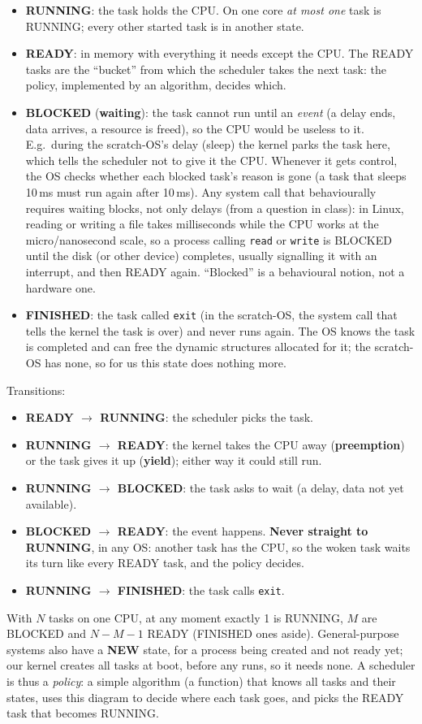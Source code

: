 \begin{itemize}
    \item \textbf{RUNNING}: the task holds the CPU. On one core \emph{at most one} task is RUNNING; every other started task is in another state.
    \item \textbf{READY}: in memory with everything it needs except the CPU. The READY tasks are the ``bucket'' from which the scheduler takes the next task: the policy, implemented by an algorithm, decides which.
    \item \textbf{BLOCKED} (\textbf{waiting}): the task cannot run until an \emph{event} (a delay ends, data arrives, a resource is freed), so the CPU would be useless to it. E.g.\ during the scratch-OS's delay (sleep) the kernel parks the task here, which tells the scheduler not to give it the CPU. Whenever it gets control, the OS checks whether each blocked task's reason is gone (a task that sleeps 10\,ms must run again after 10\,ms). Any system call that behaviourally requires waiting blocks, not only delays (from a question in class): in Linux, reading or writing a file takes milliseconds while the CPU works at the micro/nanosecond scale, so a process calling \texttt{read} or \texttt{write} is BLOCKED until the disk (or other device) completes, usually signalling it with an interrupt, and then READY again. ``Blocked'' is a behavioural notion, not a hardware one.
    \item \textbf{FINISHED}: the task called \texttt{exit} (in the scratch-OS, the system call that tells the kernel the task is over) and never runs again. The OS knows the task is completed and can free the dynamic structures allocated for it; the scratch-OS has none, so for us this state does nothing more.
\end{itemize}
Transitions:
\begin{itemize}
    \item \textbf{READY $\to$ RUNNING}: the scheduler picks the task.
    \item \textbf{RUNNING $\to$ READY}: the kernel takes the CPU away (\textbf{preemption}) or the task gives it up (\textbf{yield}); either way it could still run.
    \item \textbf{RUNNING $\to$ BLOCKED}: the task asks to wait (a delay, data not yet available).
    \item \textbf{BLOCKED $\to$ READY}: the event happens. \textbf{Never straight to RUNNING}, in any OS: another task has the CPU, so the woken task waits its turn like every READY task, and the policy decides.
    \item \textbf{RUNNING $\to$ FINISHED}: the task calls \texttt{exit}.
\end{itemize}
With $N$ tasks on one CPU, at any moment exactly 1 is RUNNING, $M$ are BLOCKED and $N - M - 1$ READY (FINISHED ones aside). General-purpose systems also have a \textbf{NEW} state, for a process being created and not ready yet; our kernel creates all tasks at boot, before any runs, so it needs none. A scheduler is thus a \emph{policy}: a simple algorithm (a function) that knows all tasks and their states, uses this diagram to decide where each task goes, and picks the READY task that becomes RUNNING.

